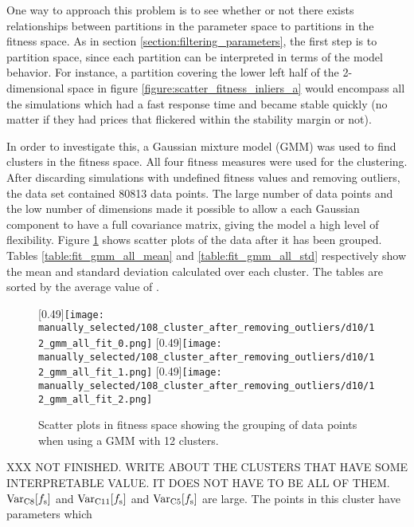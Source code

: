 One way to approach this problem is to see whether or not there exists relationships between partitions in the parameter space to partitions in the fitness space. As in section \ref{section:filtering_parameters}, the first step is to partition space, since each partition can be interpreted in terms of the model behavior. For instance, a partition covering the lower left half of the 2-dimensional space in figure \ref{figure:scatter_fitness_inliers_a} would encompass all the simulations which had a fast response time and became stable quickly (no matter if they had prices that flickered within the stability margin or not).

In order to investigate this, a Gaussian mixture model (GMM) was used to find clusters in the fitness space. All four fitness measures were used for the clustering. After discarding simulations with undefined fitness values and removing outliers, the data set contained 80813 data points. The large number of data points and the low number of dimensions made it possible to allow a each Gaussian component to have a full covariance matrix, giving the model a high level of flexibility. Figure \ref{fig:d10_scatter_clusters} shows scatter plots of the data after it has been grouped. Tables \ref{table:fit_gmm_all_mean} and \ref{table:fit_gmm_all_std} respectively show the mean and standard deviation calculated over each cluster. The tables are sorted by the average value of \overshoot.



\begin{figure}
	\centering
	\subcaptionbox{}[0.49\linewidth]{\texttt{[image: manually\_selected/108\_cluster\_after\_removing\_outliers/d10/12\_gmm\_all\_fit\_0.png]}}
	\subcaptionbox{}[0.49\linewidth]{\texttt{[image: manually\_selected/108\_cluster\_after\_removing\_outliers/d10/12\_gmm\_all\_fit\_1.png]}}
	\subcaptionbox{}[0.49\linewidth]{\texttt{[image: manually\_selected/108\_cluster\_after\_removing\_outliers/d10/12\_gmm\_all\_fit\_2.png]}}
	\caption{Scatter plots in fitness space showing the grouping of data points when using a GMM with 12 clusters.}
	\label{fig:d10_scatter_clusters}
\end{figure}

XXX NOT FINISHED. WRITE ABOUT THE CLUSTERS THAT HAVE SOME INTERPRETABLE VALUE. IT DOES NOT HAVE TO BE ALL OF THEM.
$\mathrm{Var}_\text{C8}[f_\text{s}]$ and $\mathrm{Var}_\text{C11}[f_\text{s}]$ and $\mathrm{Var}_\text{C5}[f_\text{s}]$ are large. The points in this cluster have parameters which 



